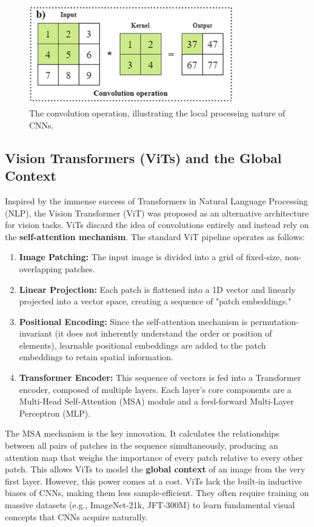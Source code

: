 \begin{figure}[H]
    \centering
    \includegraphics[width=0.8\textwidth]{archivos/figuras/convolution.jpg} 
    \caption{The convolution operation, illustrating the local processing nature of CNNs.}
    \label{fig:convolution}
\end{figure}

\subsection{Vision Transformers (ViTs) and the Global Context}
Inspired by the immense success of Transformers in Natural Language Processing (NLP), the Vision Transformer (ViT) was proposed as an alternative architecture for vision tasks. ViTs discard the idea of convolutions entirely and instead rely on the \textbf{self-attention mechanism}. The standard ViT pipeline operates as follows:

\begin{enumerate}
    \item \textbf{Image Patching:} The input image is divided into a grid of fixed-size, non-overlapping patches.
    \item \textbf{Linear Projection:} Each patch is flattened into a 1D vector and linearly projected into a vector space, creating a sequence of "patch embeddings."
    \item \textbf{Positional Encoding:} Since the self-attention mechanism is permutation-invariant (it does not inherently understand the order or position of elements), learnable positional embeddings are added to the patch embeddings to retain spatial information.
    \item \textbf{Transformer Encoder:} This sequence of vectors is fed into a Transformer encoder, composed of multiple layers. Each layer's core components are a Multi-Head Self-Attention (MSA) module and a feed-forward Multi-Layer Perceptron (MLP).
\end{enumerate}

The MSA mechanism is the key innovation. It calculates the relationships between all pairs of patches in the sequence simultaneously, producing an attention map that weighs the importance of every patch relative to every other patch. This allows ViTs to model the \textbf{global context} of an image from the very first layer. However, this power comes at a cost. ViTs lack the built-in inductive biases of CNNs, making them less sample-efficient. They often require training on massive datasets (e.g., ImageNet-21k, JFT-300M) to learn fundamental visual concepts that CNNs acquire naturally.

